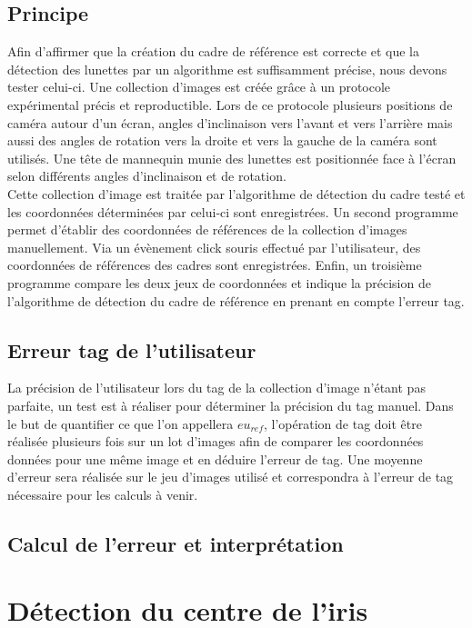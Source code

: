 \documentclass[a4paper, 12pt]{report}
\begin{document}
        	\subsection{Principe}
            Afin d'affirmer que la création du cadre de référence est correcte et que la détection des lunettes par un algorithme est suffisamment précise, nous devons tester celui-ci. Une collection d'images est créée grâce à un protocole expérimental précis et reproductible. Lors de ce protocole plusieurs positions de caméra autour d'un écran, angles d'inclinaison vers l'avant et vers l'arrière mais aussi des angles de rotation vers la droite et vers la gauche de la caméra sont utilisés. Une tête de mannequin munie des lunettes est positionnée face à l'écran selon différents angles d'inclinaison et de rotation. \\
        Cette collection d'image est traitée par l'algorithme de détection du cadre testé et les coordonnées déterminées par celui-ci sont enregistrées. Un second programme permet d'établir des coordonnées de références de la collection d'images manuellement. Via un évènement click souris effectué par l'utilisateur, des coordonnées de références des cadres sont enregistrées. Enfin, un troisième programme compare les deux jeux de coordonnées et indique la précision de l'algorithme de détection du cadre de référence en prenant en compte l'erreur tag. 
            \subsection{Erreur tag de l'utilisateur}
            La précision de l'utilisateur lors du tag de la collection d'image n'étant pas parfaite, un test est à réaliser pour déterminer la précision du tag manuel. Dans le but de quantifier ce que l'on appellera $eu_{ref}$, l'opération de tag doit être réalisée plusieurs fois sur un lot d'images afin de comparer les coordonnées données pour une même image et en déduire l'erreur de tag. Une moyenne d'erreur sera réalisée sur le jeu d'images utilisé et correspondra à l'erreur de tag nécessaire pour les calculs à venir.
            \subsection{Calcul de l'erreur et interprétation}
        \section{Détection du centre de l'iris}
\end{document}
